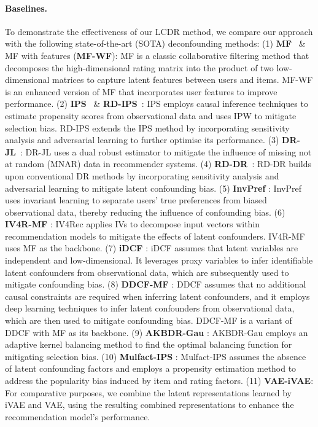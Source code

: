 \documentclass[sigconf]{acmart}
\begin{document}
\paragraph{Baselines.}
To demonstrate the effectiveness of our LCDR method, we compare our approach with the following state-of-the-art (SOTA) deconfounding methods:
(1) \textbf{MF}~\cite{12} \& MF with features (\textbf{MF-WF}): MF is a classic collaborative filtering method that decomposes the high-dimensional rating matrix into the product of two low-dimensional matrices to capture latent features between users and items. MF-WF is an enhanced version of MF that incorporates user features to improve performance.
(2) \textbf{IPS}~\cite{23} \& \textbf{RD-IPS}~\cite{4}: IPS employs causal inference techniques to estimate propensity scores from observational data and uses IPW to mitigate selection bias. RD-IPS extends the IPS method by incorporating sensitivity analysis and adversarial learning to further optimise its performance.
(3) \textbf{DR-JL}~\cite{wang2019doubly}: DR-JL uses a dual robust estimator to mitigate the influence of missing not at random (MNAR) data in recommender systems.
(4) \textbf{RD-DR}~\cite{4}: RD-DR builds upon conventional DR methods by incorporating sensitivity analysis and adversarial learning to mitigate latent confounding bias.
(5) \textbf{InvPref} \cite{30}: InvPref uses invariant learning to separate users' true preferences from biased observational data, thereby reducing the influence of confounding bias.
(6) \textbf{IV4R-MF} \cite{IV-serach-data}: IV4Rec applies IVs to decompose input vectors within recommendation models to mitigate the effects of latent confounders. IV4R-MF uses MF as the backbone.
(7) \textbf{iDCF} \cite{idcf}: iDCF assumes that latent variables are independent and low-dimensional. It leverages proxy variables to infer identifiable latent confounders from observational data, which are subsequently used to mitigate confounding bias.
(8) \textbf{DDCF-MF} \cite{38}: DDCF assumes that no additional causal constraints are required when inferring latent confounders, and it employs deep learning techniques to infer latent confounders from observational data, which are then used to mitigate confounding bias. DDCF-MF is a variant of DDCF with MF as its backbone. 
(9) \textbf{AKBDR-Gau} \cite{li2024debiased}: AKBDR-Gau employs an adaptive kernel balancing method to find the optimal balancing function for mitigating selection bias.
(10) \textbf{Mulfact-IPS} \cite{huang2024going}: Mulfact-IPS assumes the absence of latent confounding factors and employs a propensity estimation method to address the popularity bias induced by item and rating factors.
(11) \textbf{VAE-iVAE}: For comparative purposes, we combine the latent representations learned by iVAE and VAE, using the resulting combined representations to enhance the recommendation model’s performance.
\end{document}
